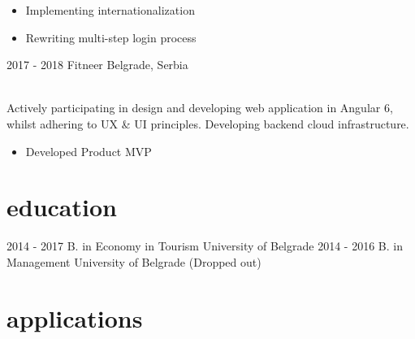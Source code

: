 \documentclass[openany]{cv-style}          %
\begin{document}
\begin{entrylist}
{    \begin{itemize}
      \item Implementing internationalization
      \item Rewriting multi-step login process
    \end{itemize}}
  \entry
  {2017 - 2018}
  {Fitneer}
  {Belgrade, Serbia}
  {\\
    Actively participating in design and developing web application in Angular 6, whilst adhering to UX \& UI principles. Developing backend cloud infrastructure.\\
    \subtitle{Detailed achievements:}
    \begin{itemize}
      \item Developed Product MVP
    \end{itemize}}

\end{entrylist}


\section{education}

\begin{entrylist}
  \entry
  {2014 - 2017}
  {B. {\normalfont in Economy in Tourism}}
  {University of Belgrade}
  {\vspace{-0.3cm}}
  \entry
  {2014 - 2016}
  {B. {\normalfont in Management}}
  {University of Belgrade}
  {(Dropped out)}
\end{entrylist}


\section{applications}
\end{document}
